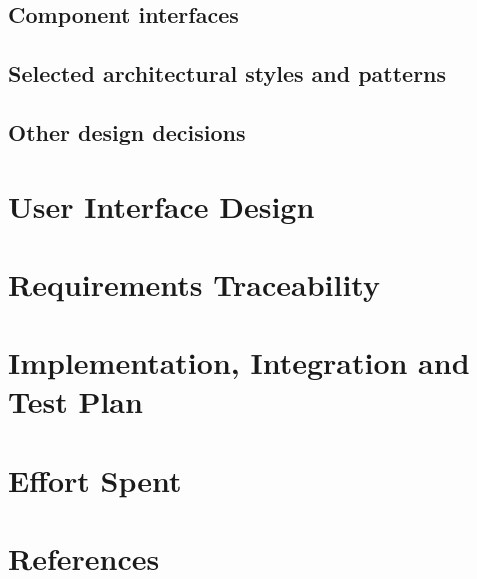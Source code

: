 \documentclass[table, 12pt]{article}
\begin{document}
\subsection{Component interfaces}

\subsection{Selected architectural styles and patterns}

\subsection{Other design decisions}

\section{User Interface Design}


\section{Requirements Traceability}


\section{Implementation, Integration and Test Plan}


\section{Effort Spent}


\section{References}
\end{document}

